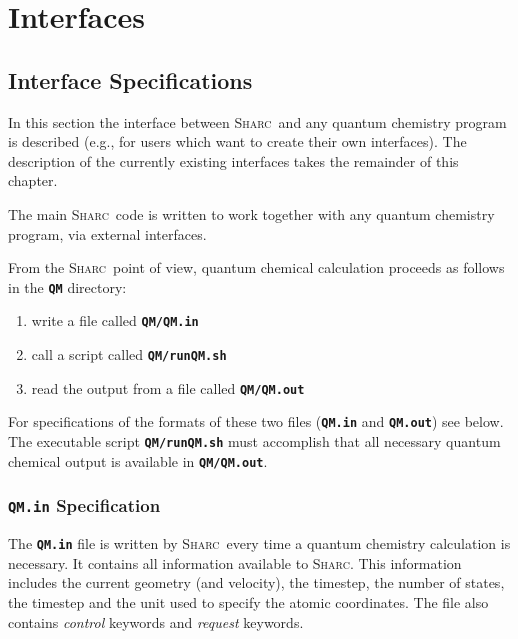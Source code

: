 \documentclass[a4paper,11pt,DIV=15,openany,twoside=false]{scrbook}
\newcommand{\sharc}{\textsc{Sharc}}
\newcommand{\ttt}[1]{\textbf{\texttt{#1}}}
\begin{document}
\chapter{Interfaces}\label{chap:interfaces}


\section{Interface Specifications}

In this section the interface between \sharc\ and any quantum chemistry program is described (e.g., for users which want to create their own interfaces). The description of the currently existing interfaces takes the remainder of this chapter.

The main \sharc\ code is written to work together with any quantum chemistry program, via external interfaces. 

From the \sharc\ point of view, quantum chemical calculation proceeds as follows in the \ttt{QM} directory:
\begin{enumerate}
  \item write a file called \ttt{QM/QM.in}
  \item call a script called \ttt{QM/runQM.sh}
  \item read the output from a file called \ttt{QM/QM.out}
\end{enumerate}
For specifications of the formats of these two files (\ttt{QM.in} and \ttt{QM.out}) see below. The executable script \ttt{QM/runQM.sh} must accomplish that all necessary quantum chemical output is available in \ttt{QM/QM.out}.

\subsection{\ttt{QM.in} Specification}\label{intf:qmin}

The \ttt{QM.in} file is written by \sharc\ every time a quantum chemistry calculation is necessary. It contains all information available to \sharc. This information includes the current geometry (and velocity), the timestep, the number of states, the timestep and the unit used to specify the atomic coordinates. The file also contains \textit{control} keywords and \textit{request} keywords. 
\end{document}
